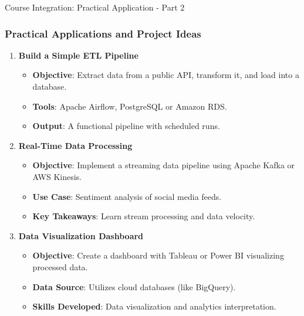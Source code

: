 \documentclass[aspectratio=169]{beamer}
\begin{document}
\begin{frame}[fragile]{Course Integration: Practical Application - Part 2}
    \frametitle{Practical Applications and Project Ideas}

    \begin{enumerate}
        \item \textbf{Build a Simple ETL Pipeline}
            \begin{itemize}
                \item \textbf{Objective}: Extract data from a public API, transform it, and load into a database.
                \item \textbf{Tools}: Apache Airflow, PostgreSQL or Amazon RDS.
                \item \textbf{Output}: A functional pipeline with scheduled runs.
            \end{itemize}

        \item \textbf{Real-Time Data Processing}
            \begin{itemize}
                \item \textbf{Objective}: Implement a streaming data pipeline using Apache Kafka or AWS Kinesis.
                \item \textbf{Use Case}: Sentiment analysis of social media feeds.
                \item \textbf{Key Takeaways}: Learn stream processing and data velocity.
            \end{itemize}
        
        \item \textbf{Data Visualization Dashboard}
            \begin{itemize}
                \item \textbf{Objective}: Create a dashboard with Tableau or Power BI visualizing processed data.
                \item \textbf{Data Source}: Utilizes cloud databases (like BigQuery).
                \item \textbf{Skills Developed}: Data visualization and analytics interpretation.
            \end{itemize}
    \end{enumerate}
\end{frame}
\end{document}
